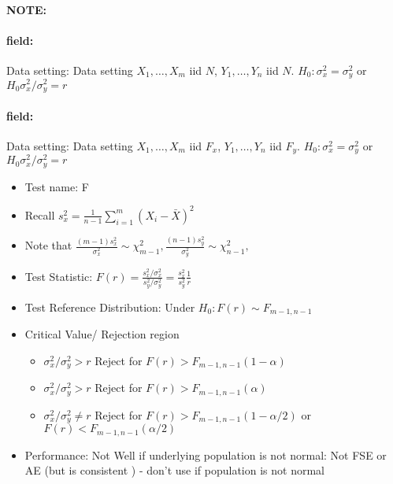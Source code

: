 \documentclass[12pt]{article}
\newenvironment{note}{\paragraph{NOTE:}}{}
\newenvironment{field}{\paragraph{field:}}{}
\begin{document}
\begin{note}
  \begin{field}
    Data setting: Data setting $X_1, \ldots , X_m$ iid $N$, $Y_1, \ldots, Y_n$ iid $N$. $H_0: \sigma_x^2 = \sigma_y^2$ or $H_0 \sigma_x^2/\sigma_y^2 = r$
  \end{field}
  \begin{field}
    Data setting: Data setting $X_1, \ldots , X_m$ iid $F_x$, $Y_1, \ldots, Y_n$ iid $F_y$. $H_0: \sigma_x^2 = \sigma_y^2$ or $H_0 \sigma_x^2/\sigma_y^2 = r$
    \begin{itemize}
      \item Test name: F
      \item Recall $s_x^2 = \frac{1}{n-1}\sum_{i=1}^m(X_i - \bar{X})^2$
      \item Note that $\frac{(m-1)s_x^2}{\sigma_x^2} \sim \chi^2_{m-1}, \frac{(n-1)s_y^2}{\sigma_y^2} \sim \chi^2_{n-1},$
      \item Test Statistic: $F(r) = \frac{s_x^2/\sigma_x^2}{s_y^2/\sigma_y^2} = \frac{s_x^2}{s_y^2} \frac{1}{r}$
      \item Test Reference Distribution: Under $H_0: F(r) \sim F_{m-1,n-1}$
      \item Critical Value/ Rejection region
      \begin{itemize}
        \item $\sigma_x^2/\sigma_y^2 > r$ Reject for $F(r) > F_{m-1,n-1}(1-\alpha)$
        \item $\sigma_x^2/\sigma_y^2 > r$ Reject for $F(r) > F_{m-1,n-1}(\alpha)$
        \item $\sigma_x^2/\sigma_y^2 \neq r$ Reject for $F(r) > F_{m-1,n-1}(1-\alpha/2)$ or $F(r) < F_{m-1,n-1}(\alpha/2)$
      \end{itemize}
      \item Performance: Not Well if underlying population is not normal: Not FSE or AE (but is consistent ) - don't use if population is not normal
    \end{itemize}
  \end{field}
\end{note}
\end{document}
